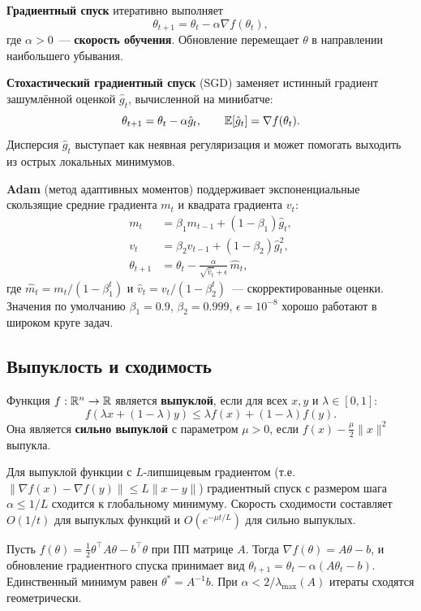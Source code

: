\textbf{Градиентный спуск} итеративно выполняет
\[
    \theta_{t+1} = \theta_t - \alpha \nabla f(\theta_t),
\]
где $\alpha > 0$~--- \textbf{скорость обучения}. Обновление перемещает $\theta$ в направлении наибольшего убывания.

\textbf{Стохастический градиентный спуск} (SGD) заменяет истинный градиент зашумлённой оценкой $\hat{g}_t$, вычисленной на минибатче:
\[
    \theta_{t+1} = \theta_t - \alpha \hat{g}_t, \qquad
    \operatorname{\mathbb{E}}[\hat{g}_t] = \nabla f(\theta_t).
\]
Дисперсия $\hat{g}_t$ выступает как неявная регуляризация и может помогать выходить из острых локальных минимумов.

\textbf{Adam} (метод адаптивных моментов) поддерживает экспоненциальные скользящие средние градиента $m_t$ и квадрата градиента $v_t$:
\begin{align*}
    m_t &= \beta_1 m_{t-1} + (1-\beta_1)\hat{g}_t, \\
    v_t &= \beta_2 v_{t-1} + (1-\beta_2)\hat{g}_t^2, \\
    \theta_{t+1} &= \theta_t - \frac{\alpha}{\sqrt{\hat{v}_t}+\epsilon}\,\hat{m}_t,
\end{align*}
где $\hat{m}_t = m_t/(1-\beta_1^t)$ и $\hat{v}_t = v_t/(1-\beta_2^t)$~--- скорректированные оценки. Значения по умолчанию $\beta_1=0.9$, $\beta_2=0.999$, $\epsilon=10^{-8}$ хорошо работают в широком круге задач.

\subsection*{Выпуклость и сходимость}

\begin{definition}[Выпуклость]
\label{def:convexity}
Функция $f: \mathbb{R}^n \to \mathbb{R}$ является \textbf{выпуклой}, если для всех $x,y$ и $\lambda \in [0,1]$:
\[
    f(\lambda x + (1-\lambda)y) \leq \lambda f(x) + (1-\lambda)f(y).
\]
Она является \textbf{сильно выпуклой} с параметром $\mu > 0$, если $f(x) - \frac{\mu}{2}\|x\|^2$ выпукла.
\end{definition}

Для выпуклой функции с $L$-липшицевым градиентом (т.е. $\|\nabla f(x)-\nabla f(y)\| \leq L\|x-y\|$) градиентный спуск с размером шага $\alpha \leq 1/L$ сходится к глобальному минимуму. Скорость сходимости составляет $O(1/t)$ для выпуклых функций и $O(e^{-\mu t/L})$ для сильно выпуклых.

\begin{example}
Пусть $f(\theta) = \frac{1}{2}\theta^\top A\theta - b^\top\theta$ при ПП матрице $A$. Тогда $\nabla f(\theta) = A\theta - b$, и обновление градиентного спуска принимает вид $\theta_{t+1} = \theta_t - \alpha(A\theta_t - b)$. Единственный минимум равен $\theta^* = A^{-1}b$. При $\alpha < 2/\lambda_{\max}(A)$ итераты сходятся геометрически.
\end{example}

